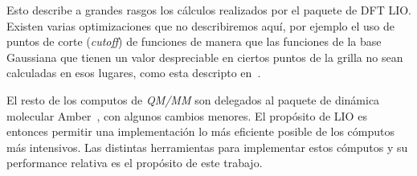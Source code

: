 Esto describe a grandes rasgos los c\'alculos realizados por el paquete de DFT
LIO. Existen varias optimizaciones que no describiremos aqu\'i, por ejemplo el uso de
puntos de corte (\textit{cutoff}) de funciones de manera que las funciones de la
base Gaussiana que tienen un valor despreciable en ciertos puntos de la grilla no
sean calculadas en esos lugares, como esta descripto en~\cite{PaperNitscheManu}.

El resto de los computos de \textit{QM/MM} son delegados al paquete de din\'amica
molecular Amber~\cite{Amber}, con algunos cambios menores. El prop\'osito de LIO es
entonces permitir una implementaci\'on lo m\'as eficiente posible de los c\'omputos
m\'as intensivos. Las distintas herramientas para implementar estos c\'omputos y
su performance relativa es el prop\'osito de este trabajo.
